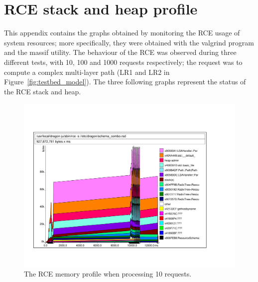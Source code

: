 \documentclass[10pt,a4paper]{report}
\begin{document}
\chapter{RCE stack and heap profile}
This appendix contains the graphs obtained by monitoring the RCE usage
of system resources; more specifically, they were obtained with the
valgrind program and the massif utility. The behaviour of the RCE was
observed during three different tests, with 10, 100 and 1000 requests
respectively; the request was to compute a complex multi-layer path
(LR1 and LR2 in Figure~\ref{fig:testbed_model}). The three following
graphs represent the status of the RCE stack and heap.

\begin{figure}[!htbp]
  \begin{center}
    \includegraphics[angle=270,scale=0.70]{img/multi-10}
    \caption[RCE memory profile (10 requests)]{The RCE memory profile
      when processing 10 requests.}
    \label{fig:multi-10}
  \end{center}
\end{figure}
\end{document}
